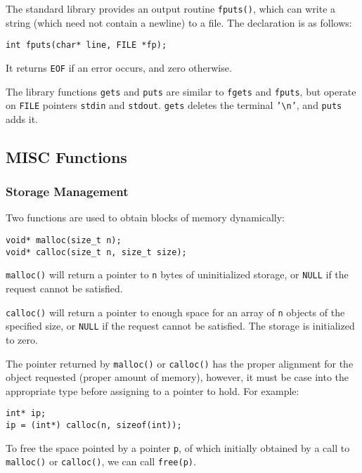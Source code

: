 \documentclass[11pt]{article}
\begin{document}
The standard library provides an output routine \texttt{fputs()}, which can write a string (which need not contain a newline) to a file. The declaration is as follows:
\begin{verbatim}
int fputs(char* line, FILE *fp);
\end{verbatim}
It returns \texttt{EOF} if an error occurs, and zero otherwise.

The library functions \texttt{gets} and \texttt{puts} are similar to \texttt{fgets} and \texttt{fputs}, but operate on \texttt{FILE} pointers \texttt{stdin} and \texttt{stdout}. \texttt{gets} deletes the terminal \texttt{'\textbackslash{}n'}, and \texttt{puts} adds it.
\subsection{MISC Functions}
\label{sec:org582ba53}
\subsubsection{Storage Management}
\label{sec:org26f45ff}
Two functions are used to obtain blocks of memory dynamically:
\begin{verbatim}
void* malloc(size_t n);
void* calloc(size_t n, size_t size);
\end{verbatim}

\texttt{malloc()} will return a pointer to \texttt{n} bytes of uninitialized storage, or \texttt{NULL} if the request cannot be satisfied.

\texttt{calloc()} will return a pointer to enough space for an array of \texttt{n} objects of the specified size, or \texttt{NULL} if the request cannot be satisfied. The storage is initialized to zero.

The pointer returned by \texttt{malloc()} or \texttt{calloc()} has the proper alignment for the object requested (proper amount of memory), however, it must be case into the appropriate type before assigning to a pointer to hold. For example:
\begin{verbatim}
int* ip;
ip = (int*) calloc(n, sizeof(int));
\end{verbatim}

To free the space pointed by a pointer \texttt{p}, of which initially obtained by a call to \texttt{malloc()} or \texttt{calloc()}, we can call \texttt{free(p)}.
\end{document}
